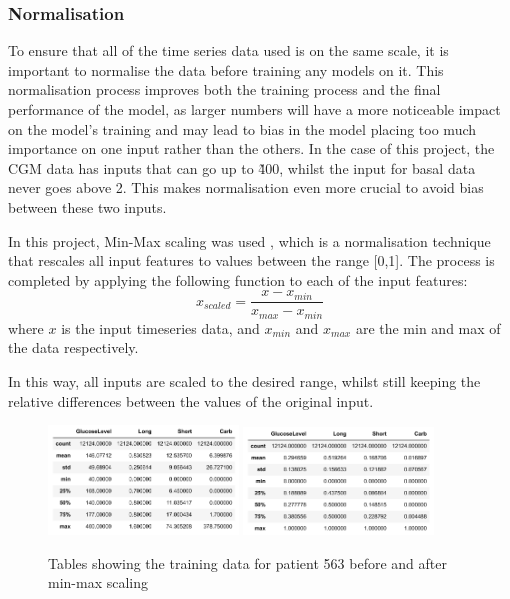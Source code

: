           \subsubsection{Normalisation}

            To ensure that all of the time series data used is on the same scale, it is important to normalise the data before training any models on it. This normalisation process improves both the training process and the final performance of the model, as larger numbers will have a more noticeable impact on the model's training and may lead to bias in the model placing too much importance on one input rather than the others. In the case of this project, the CGM data has inputs that can go up to \~400, whilst the input for basal data never goes above 2. This makes normalisation even more crucial to avoid bias between these two inputs.

            In this project, Min-Max scaling was used \cite{minmax}, which is a normalisation technique that rescales all input features to values between the range [0,1]. The process is completed by applying the following function to each of the input features:
            \[x_{scaled} = \frac{x - x_{min}}{x_{max} - x_{min}}\]
            where $x$ is the input timeseries data, and $x_{min}$ and $x_{max}$ are the min and max of the data respectively.

            In this way, all inputs are scaled to the desired range, whilst still keeping the relative differences between the values of the original input.

            \begin{figure}[H]
              \centering
  
              \includegraphics[width=0.45\textwidth]{images/UnNormed.png}
              \includegraphics[width=0.45\textwidth]{images/Normed.png}  
              \caption{
               Tables showing the training data for patient 563 before and after min-max scaling
              }
            \end{figure}

